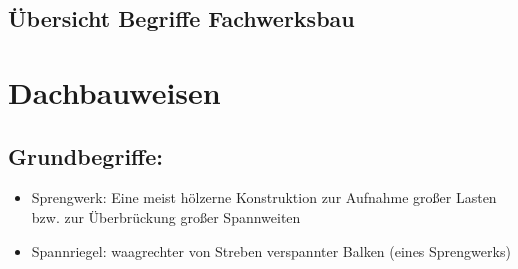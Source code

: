 \documentclass[fleqn,twoside]{article}
\begin{document}
\subsection{Übersicht Begriffe Fachwerksbau}
\begin{center}
\scriptsize
    
\scriptsize
\end{center}
    

\newpage
\section{Dachbauweisen}
    
    \subsection{Grundbegriffe:}
        \begin{itemize}
            \item Sprengwerk: Eine meist hölzerne Konstruktion zur Aufnahme großer Lasten bzw. zur Überbrückung großer Spannweiten
            \item Spannriegel: waagrechter von Streben verspannter Balken (eines Sprengwerks)
        \end{itemize}
    
\end{document}
